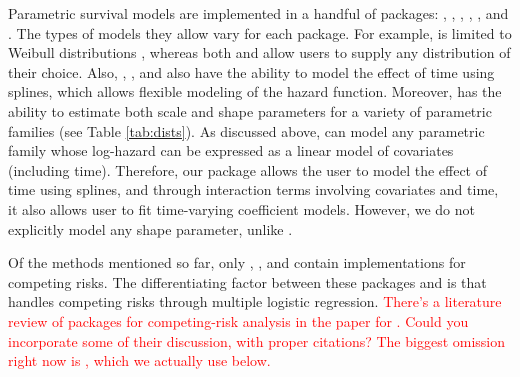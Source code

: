 \documentclass[
]{jss}
\begin{document}
Parametric survival models are implemented in a handful of packages:
 \citeyearpar{sharabiani_mahani_2019}, 
\citeyearpar{flexsurv},  \citeyearpar{smoothHazard},
 \citeyearpar{clements_liu}, 
\citeyearpar{scheike2014estimating}, and . The types of
models they allow vary for each package. For example, 
is limited to Weibull distributions \citeyearpar{smoothHazard}, whereas
both  and  allow users to supply any
distribution of their choice. Also, , ,
 and  also have the ability to model the effect of
time using splines, which allows flexible modeling of the hazard
function. Moreover,  has the ability to estimate both
scale and shape parameters for a variety of parametric families (see
Table \ref{tab:dists}). As discussed above,  can model any
parametric family whose log-hazard can be expressed as a linear model of
covariates (including time). Therefore, our package allows the user to
model the effect of time using splines, and through interaction terms
involving covariates and time, it also allows user to fit time-varying
coefficient models. However, we do not explicitly model any shape
parameter, unlike .

Of the methods mentioned so far, only , ,
 and  contain implementations for competing
risks. The differentiating factor between these packages and
 is that  handles competing risks through
multiple logistic regression.
\textcolor{red}{There's a literature review of packages for competing-risk analysis in the paper for . Could you incorporate some of their discussion, with proper citations? The biggest omission right now is , which we actually use below.}
\end{document}
